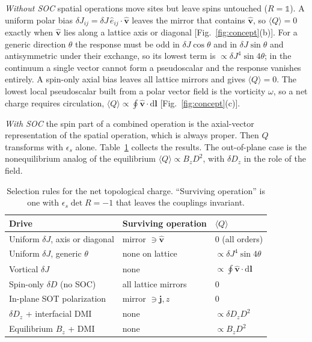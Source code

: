 \documentclass[aps,prb,twocolumn,superscriptaddress,longbibliography,floatfix]{revtex4-2}
\newcommand{\vv}{\mathbf v}
\newcommand{\dd}{\mathrm d}
\newcommand{\avg}[1]{\langle #1\rangle}
\begin{document}
\emph{Without SOC} spatial operations move sites but leave spins untouched ($R=\mathbb 1$). A uniform polar bias $\delta J_{ij}=\delta J\,\hat e_{ij}\cdot\hat{\vv}$ leaves the mirror that contains $\hat{\vv}$, so $\avg{Q}=0$ exactly when $\hat{\vv}$ lies along a lattice axis or diagonal [Fig.~\ref{fig:concept}(b)]. For a generic direction $\theta$ the response must be odd in $\delta J\cos\theta$ and in $\delta J\sin\theta$ and antisymmetric under their exchange, so its lowest term is $\propto\delta J^4\sin4\theta$; in the continuum a single vector cannot form a pseudoscalar and the response vanishes entirely. A spin-only axial bias leaves all lattice mirrors and gives $\avg{Q}=0$. The lowest local pseudoscalar built from a polar vector field is the vorticity $\omega$, so a net charge requires circulation, $\avg{Q}\propto\oint\hat{\vv}\cdot\dd\mathbf l$ [Fig.~\ref{fig:concept}(c)].

\emph{With SOC} the spin part of a combined operation is the axial-vector representation of the spatial operation, which is always proper. Then $Q$ transforms with $\epsilon_s$ alone. Table~\ref{tab:selection} collects the results. The out-of-plane case is the nonequilibrium analog of the equilibrium $\avg{Q}\propto B_zD^2$, with $\delta D_z$ in the role of the field.

\begin{table}[b]
\caption{Selection rules for the net topological charge. ``Surviving operation'' is one with $\epsilon_s\det R=-1$ that leaves the couplings invariant.}
\label{tab:selection}
\begin{ruledtabular}
\footnotesize
\begin{tabular}{lll}
Drive & Surviving operation & $\avg{Q}$\\
\hline
Uniform $\delta J$, axis or diagonal & mirror $\ni\hat{\vv}$ & 0 (all orders)\\
Uniform $\delta J$, generic $\theta$ & none on lattice & $\propto\delta J^4\sin4\theta$\\
Vortical $\delta J$ & none & $\propto\oint\hat{\vv}\cdot\dd\mathbf l$\\
Spin-only $\delta D$ (no SOC) & all lattice mirrors & 0\\
In-plane SOT polarization & mirror $\ni\mathbf j,\hat z$ & 0\\
$\delta D_z$ + interfacial DMI & none & $\propto\delta D_z D^2$\\
Equilibrium $B_z$ + DMI & none & $\propto B_zD^2$\\
\end{tabular}
\end{ruledtabular}
\end{table}
\end{document}
